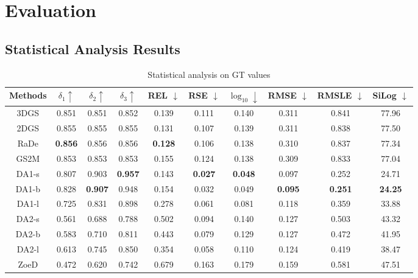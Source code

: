 
\chapter{Evaluation}\label{chapter:evaluation}

\section{Statistical Analysis Results}

\begin{center}
\begin{table}[h]
    \centering
    \begin{tabular}{||c||c|c|c|c|c|c|c|c|c||}
    \hline
         Methods & \(\delta_1 \uparrow\)  & \(\delta_2 \uparrow\) & \(\delta_3  \uparrow\)  & REL \(\downarrow\) & RSE \(\downarrow\) & \(\log_{10} \downarrow\) &  RMSE \(\downarrow\) & RMSLE \(\downarrow\) & SiLog \(\downarrow\) \\
    \hline \hline
         3DGS & 0.851 & 0.851 & 0.852 & 0.139 & 0.111 & 0.140 & 0.311 & 0.841 & 77.96\\
         2DGS & 0.855 & 0.855 & 0.855 & 0.131 & 0.107 & 0.139 & 0.311 & 0.838 & 77.50\\
         RaDe & \textbf{0.856} & 0.856 & 0.856 & \textbf{0.128} & 0.106 & 0.138 & 0.310 & 0.837 & 77.34 \\
         GS2M & 0.853 & 0.853 & 0.853 & 0.155 & 0.124 & 0.138 & 0.309 & 0.833 & 77.04 \\
         DA1-s & 0.807 & 0.903 & \textbf{0.957} & 0.143 & \textbf{0.027} & \textbf{0.048} & 0.097 & 0.252 & 24.71\\
         DA1-b & 0.828 & \textbf{0.907} & 0.948 & 0.154 & 0.032 & 0.049 & \textbf{0.095} & \textbf{0.251} & \textbf{24.25} \\
         DA1-l & 0.725 & 0.831 & 0.898 & 0.278 & 0.061 & 0.081 & 0.118 & 0.359 & 33.88 \\
         DA2-s & 0.561 & 0.688 & 0.788 & 0.502 & 0.094 & 0.140 & 0.127 & 0.503 & 43.32  \\
         DA2-b & 0.583 & 0.710 & 0.811 & 0.443 & 0.079 & 0.129 & 0.127 & 0.472 & 41.95\\
         DA2-l & 0.613 & 0.745 & 0.850 & 0.354 & 0.058 & 0.110 & 0.124 & 0.419 & 38.47 \\
         ZoeD & 0.472 & 0.620 & 0.742 & 0.679 & 0.163 & 0.179 & 0.159 & 0.581 & 47.51 \\
    \hline
    \end{tabular}
    \caption{Statistical analysis on GT values}
    \label{tab:stat-analysis}
\end{table}
\end{center}

